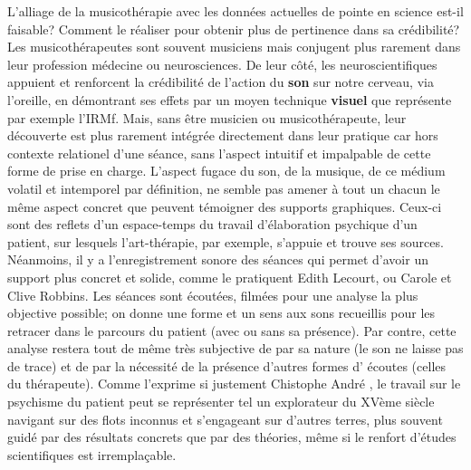L'alliage de la musicothérapie avec les données actuelles de pointe en
science est-il faisable? Comment le réaliser pour obtenir plus de pertinence
dans sa crédibilité?
Les musicothérapeutes sont souvent musiciens mais conjugent plus
rarement dans leur profession
médecine ou neurosciences. De leur côté, les neuroscientifiques appuient
et renforcent la crédibilité de l'action du \textbf{son} sur notre cerveau, via
l'oreille, en démontrant ses effets par un moyen technique
\textbf{visuel} que représente par exemple l'IRMf. Mais, sans être musicien ou
musicothérapeute, leur découverte est plus rarement intégrée
directement dans leur pratique car hors contexte relationel d'une
séance, sans l'aspect intuitif et impalpable de cette forme de prise
en charge.
L'aspect fugace du son, de la musique, de ce médium volatil et
intemporel par
définition, ne semble pas amener à tout un chacun le
même aspect concret que peuvent témoigner des supports
graphiques. Ceux-ci sont des
reflets d'un espace-temps du travail d'élaboration
psychique d'un patient, sur lesquels l'art-thérapie, par exemple, s'appuie et trouve
ses sources.
Néanmoins, il y a l'enregistrement sonore des séances qui
permet d'avoir un support plus concret et solide, comme le pratiquent Edith Lecourt, ou Carole et Clive
Robbins.  \autocite {lecourt_les_2017}
Les séances sont écoutées, filmées pour une
analyse la plus objective possible; on donne
une forme et un sens aux sons recueillis pour les retracer dans le
parcours du patient (avec ou sans sa présence). Par contre, cette analyse  restera
tout de même très subjective de par sa nature (le son ne laisse pas
de trace) et de par la nécessité de la présence d'autres formes d'
écoutes (celles du thérapeute).
Comme l'exprime si justement Chistophe André \autocite[154]{van_eersel_cerveau}, le travail sur le psychisme du patient peut se  représenter tel un
explorateur du XVème siècle navigant sur des flots inconnus et
s'engageant sur d'autres terres, plus souvent guidé par des résultats
concrets que par des théories, même si le renfort d'études
scientifiques est irremplaçable.
